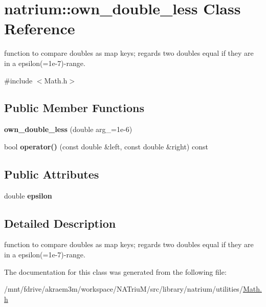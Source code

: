 \hypertarget{classnatrium_1_1own__double__less}{
\section{natrium::own\_\-double\_\-less Class Reference}
\label{classnatrium_1_1own__double__less}
}


function to compare doubles as map keys; regards two doubles equal if they are in a epsilon(=1e-\/7)-\/range.  


{\ttfamily \#include $<$Math.h$>$}\subsection*{Public Member Functions}
\begin{DoxyCompactItemize}
\item 
\hypertarget{classnatrium_1_1own__double__less_a3cbd05132e02d1081bef86fc48e38850}{
{\bfseries own\_\-double\_\-less} (double arg\_\-=1e-\/6)}
\label{classnatrium_1_1own__double__less_a3cbd05132e02d1081bef86fc48e38850}

\item 
\hypertarget{classnatrium_1_1own__double__less_a79f21afda2b0b72708c20ce78080dbc7}{
bool {\bfseries operator()} (const double \&left, const double \&right) const }
\label{classnatrium_1_1own__double__less_a79f21afda2b0b72708c20ce78080dbc7}

\end{DoxyCompactItemize}
\subsection*{Public Attributes}
\begin{DoxyCompactItemize}
\item 
\hypertarget{classnatrium_1_1own__double__less_a5de868df983787412438c481c21621a7}{
double {\bfseries epsilon}}
\label{classnatrium_1_1own__double__less_a5de868df983787412438c481c21621a7}

\end{DoxyCompactItemize}


\subsection{Detailed Description}
function to compare doubles as map keys; regards two doubles equal if they are in a epsilon(=1e-\/7)-\/range. 

The documentation for this class was generated from the following file:\begin{DoxyCompactItemize}
\item 
/mnt/fdrive/akraem3m/workspace/NATriuM/src/library/natrium/utilities/\hyperlink{Math_8h}{Math.h}\end{DoxyCompactItemize}
